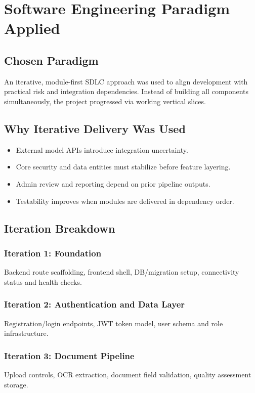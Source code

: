\chapter{Software Engineering Paradigm Applied}

\section{Chosen Paradigm}
An iterative, module-first SDLC approach was used to align development with practical risk and integration dependencies. Instead of building all components simultaneously, the project progressed via working vertical slices.

\section{Why Iterative Delivery Was Used}
\begin{itemize}
\item External model APIs introduce integration uncertainty.
\item Core security and data entities must stabilize before feature layering.
\item Admin review and reporting depend on prior pipeline outputs.
\item Testability improves when modules are delivered in dependency order.
\end{itemize}

\section{Iteration Breakdown}
\subsection{Iteration 1: Foundation}
Backend route scaffolding, frontend shell, DB/migration setup, connectivity status and health checks.

\subsection{Iteration 2: Authentication and Data Layer}
Registration/login endpoints, JWT token model, user schema and role infrastructure.

\subsection{Iteration 3: Document Pipeline}
Upload controls, OCR extraction, document field validation, quality assessment storage.

